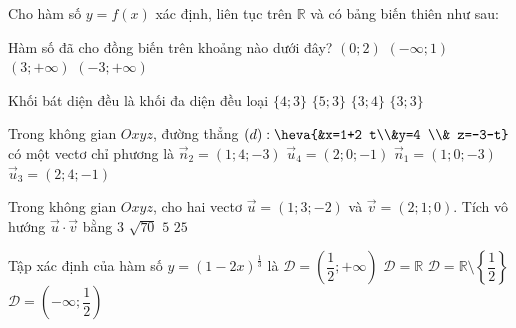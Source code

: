 \begin{ex}%
	Cho hàm số $y=f(x)$ xác định, liên tục trên $\mathbb{R}$ và có bảng biến thiên như sau:
	\begin{center}
	\end{center}
	Hàm số đã cho đồng biến trên khoảng nào dưới đây?
	\choice
	{$(0; 2)$}
	{$(-\infty; 1)$}
	{\True $(3;+\infty)$}
	{$(-3;+\infty)$}
\end{ex}
\begin{ex}%
	Khối bát diện đều là khối đa diện đều loại
	\choice
	{$\{4; 3\}$}
	{$\{5; 3\}$}
	{\True $\{3; 4\}$}
	{$\{3; 3\}$}
\end{ex}

\begin{ex}%
	Trong không gian $Oxyz$, đường thẳng $(d):\heva{&x=1+2 t\\&y=4 \\& z=-3-t}$ có một vectơ chỉ phương là
	\choice
	{$\vec{n}_2=(1; 4;-3)$}
	{\True $\vec{u}_4=(2; 0;-1)$}
	{$\vec{n}_1=(1; 0;-3)$}
	{$\vec{u}_3=(2; 4;-1)$}
\end{ex}
\begin{ex}%
	Trong không gian $Oxyz$, cho hai vectơ $\vec{u}=(1; 3;-2)$ và $\vec{v}=(2; 1; 0)$. Tích vô hướng $\vec{u}\cdot \vec{v}$ bằng
	\choice
	{$3$}
	{$\sqrt{70}$}
	{\True $5$}
	{$25$}
\end{ex}
\begin{ex}%
	Tập xác định của hàm số $y=(1-2x)^{\frac{1}{3}}$ là
	\choice
	{$\mathscr{D}=\left(\dfrac{1}{2};+\infty\right)$}
	{$\mathscr{D}=\mathbb{R}$}
	{$\mathscr{D}=\mathbb{R}\setminus \left\{\dfrac{1}{2}\right\}$}
	{\True $\mathscr{D}=\left(-\infty; \dfrac{1}{2}\right)$}
\end{ex}

